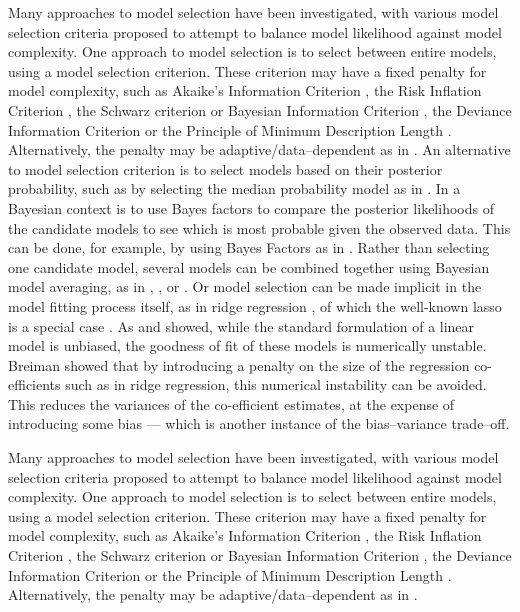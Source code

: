 Many approaches to model selection have been investigated, with various model selection criteria
proposed to attempt to balance model likelihood against model complexity. One approach to model selection is
to select between entire models, using a model selection criterion. These criterion may have a fixed penalty
for model complexity, such as Akaike's Information Criterion \citep{Akaike1974}, the Risk Inflation Criterion
\citep{Foster1994}, the Schwarz criterion or Bayesian Information Criterion \citep{Schwarz1978}, the Deviance
Information Criterion \citep{Spiegelhalter2016} or the Principle of Minimum Description Length
\citep{Hansen2001}. Alternatively, the penalty may be adaptive/data--dependent as in \citep{George2000}. An
alternative to model selection criterion is to select models based on their posterior probability, such as by
selecting the median probability model as in \citep{Barbieri2004}. In a Bayesian context is to use Bayes
factors to compare the posterior likelihoods of the candidate models to see which is most probable given the
observed data. This can be done, for example, by using Bayes Factors as in \citep{Kass1993}. Rather than
selecting one candidate model, several models can be combined together using Bayesian model  averaging, as in
\citep{Hoeting1999}, \citep{Raftery1997}, \citep{Fernandez2001} or \citep{Papaspiliopoulos2016}. Or model
selection can be made implicit in the model fitting process itself, as in ridge regression \citep{Casella1980},
of which the well-known lasso is a special case \citep{Tibshirani1996}. As \citep{Breiman1996} and
\citep{Efron2013} showed, while  the standard formulation of a linear model is unbiased, the goodness of fit of
these models is numerically  unstable. Breiman showed that by introducing a penalty on the size of the
regression co- efficients such as  in ridge regression, this numerical instability can be avoided. This
reduces the variances of the co-efficient estimates, at the expense of introducing some bias --- 
which is another instance of the bias--variance trade--off.

Many approaches to model selection have been investigated, with various model selection criteria proposed to
attempt to balance model likelihood against model complexity. One approach to model selection is to select
between entire models, using a model selection criterion. These criterion may have a fixed penalty for model
complexity, such as Akaike's Information Criterion \citep{Akaike1974}, the Risk Inflation Criterion
\citep{Foster1994}, the Schwarz criterion or Bayesian Information Criterion \citep{Schwarz1978}, the Deviance
Information Criterion \citep{Spiegelhalter2016} or the Principle of Minimum Description Length
\citep{Hansen2001}. Alternatively, the penalty may be adaptive/data--dependent as in \citep{George2000}.

